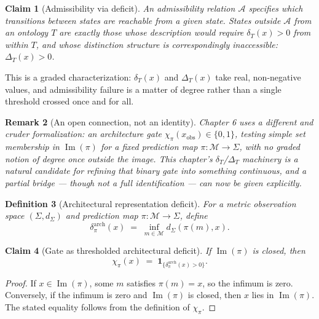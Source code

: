 \documentclass[12pt]{report}
\newtheorem{definition}{Definition}[section]
\newtheorem{claim}[definition]{Claim}
\newtheorem{remark}[definition]{Remark}
\begin{document}
\begin{claim}[Admissibility via deficit]
\label{claim:admissibility-deficit}
An admissibility relation $\mathcal{A}$ specifies which transitions
between states are reachable from a given state. States outside
$\mathcal{A}$ from an ontology $T$ are exactly those whose description
would require $\delta_T(x) > 0$ from within $T$, and whose distinction
structure is correspondingly inaccessible: $\Delta_T(x) > 0$.
\end{claim}

This is a graded characterization: $\delta_T(x)$ and $\Delta_T(x)$ take
real, non-negative values, and admissibility failure is a matter of
degree rather than a single threshold crossed once and for all.

\begin{remark}[An open connection, not an identity]
\label{rem:gate-connection}
Chapter 6 uses a different and cruder formalization: an architecture gate
$\chi_\pi(x_{\mathrm{obs}}) \in \{0,1\}$, testing simple set membership in
$\operatorname{Im}(\pi)$ for a fixed prediction map $\pi : \mathcal{M} \to
\Sigma$, with no graded notion of degree once outside the image. This
chapter's $\delta_T$/$\Delta_T$ machinery is a natural candidate for
refining that binary gate into something continuous, and a partial
bridge --- though not a full identification --- can now be given
explicitly.
\end{remark}

\begin{definition}[Architectural representation deficit]
\label{def:arch-deficit}
For a metric observation space $(\Sigma, d_\Sigma)$ and prediction map
$\pi : \mathcal{M} \to \Sigma$, define
\[
\delta_\pi^{\mathrm{arch}}(x) \;=\; \inf_{m \in \mathcal{M}} d_\Sigma(\pi(m), x).
\]
\end{definition}

\begin{claim}[Gate as thresholded architectural deficit]
\label{thm:gate-threshold}
If $\operatorname{Im}(\pi)$ is closed, then
\[
\chi_\pi(x) \;=\; \mathbf{1}_{\{\delta_\pi^{\mathrm{arch}}(x) > 0\}}.
\]
\end{claim}

\begin{proof}
If $x \in \operatorname{Im}(\pi)$, some $m$ satisfies $\pi(m) = x$, so the
infimum is zero. Conversely, if the infimum is zero and
$\operatorname{Im}(\pi)$ is closed, then $x$ lies in $\operatorname{Im}(\pi)$.
The stated equality follows from the definition of $\chi_\pi$.
\end{proof}
\end{document}
